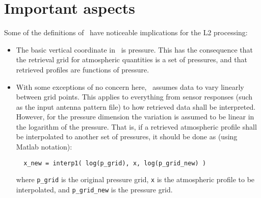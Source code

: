 %



\section{Important aspects}
\label{sec:arts:aspects}
%
Some of the definitions of \ARTS\ have noticeable implications for the
L2 processing:
\begin{itemize}
\item The basic vertical coordinate in \ARTS\ is pressure. This has the
  consequence that the retrieval grid for atmospheric quantities is a set of
  pressures, and that retrieved profiles are functions of pressure.
\item With some exceptions of no concern here, \ARTS\ assumes data to vary
  linearly between grid points. This applies to everything from sensor responses
  (such as the input antenna pattern file) to how retrieved data shall be
  interpreted. However, for the pressure dimension the variation is assumed to
  be linear in the logarithm of the pressure. That is, if a retrieved
  atmospheric profile shall be interpolated to another set of pressures, it
  should be done as (using Matlab notation):
\begin{verbatim}
  x_new = interp1( log(p_grid), x, log(p_grid_new) )
\end{verbatim}
where \verb|p_grid| is the original pressure grid, \verb|x| is the atmospheric
profile to be interpolated, and \verb|p_grid_new| is the pressure grid.
\end{itemize}




